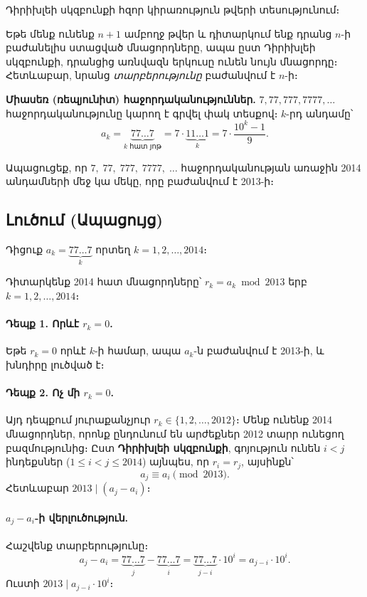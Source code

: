 \documentclass[12pt, a4paper]{article}
\begin{document}
\begin{theorybox}
Դիրիխլեի սկզբունքի հզոր կիրառություն թվերի տեսությունում։

\medskip
Եթե մենք ունենք $n+1$ ամբողջ թվեր և դիտարկում ենք դրանց $n$-ի բաժանելիս ստացված մնացորդները,
ապա ըստ Դիրիխլեի սկզբունքի, դրանցից առնվազն երկուսը ունեն
նույն մնացորդը։ Հետևաբար, նրանց \emph{տարբերությունը} բաժանվում է $n$-ի։

\medskip
\textbf{Միասեռ (ռեպյունիտ) հաջորդականություններ.}\;
$7, 77, 777, 7777, \ldots$ հաջորդականությունը կարող է գրվել փակ տեսքով։
$k$-րդ անդամը՝
\[
  a_k = \underbrace{77\ldots7}_{k \text{ հատ յոթ}}
      = 7 \cdot \underbrace{11\ldots1}_{k}
      = 7 \cdot \frac{10^k - 1}{9}.
\]
\end{theorybox}

\begin{problembox}
Ապացուցեք, որ $7,\; 77,\; 777,\; 7777,\; \ldots$ հաջորդականության
առաջին 2014 անդամների մեջ կա մեկը, որը բաժանվում է 2013-ի։
\end{problembox}

\subsection*{Լուծում (Ապացույց)}

Դիցուք $a_k = \underbrace{77\ldots7}_{k}$ որտեղ $k = 1, 2, \ldots, 2014$։

Դիտարկենք 2014 հատ մնացորդները՝ $r_k = a_k \bmod 2013$ երբ $k = 1, 2, \ldots, 2014$։

\paragraph{Դեպք 1. Որևէ $r_k = 0$.}
Եթե $r_k = 0$ որևէ $k$-ի համար, ապա $a_k$-ն բաժանվում է 2013-ի, և խնդիրը լուծված է։

\paragraph{Դեպք 2. Ոչ մի $r_k = 0$.}
Այդ դեպքում յուրաքանչյուր $r_k \in \{1, 2, \ldots, 2012\}$։
Մենք ունենք 2014 մնացորդներ, որոնք ընդունում են արժեքներ 2012 տարր ունեցող բազմությունից։
Ըստ \textbf{Դիրիխլեի սկզբունքի}, գոյություն ունեն $i < j$ ինդեքսներ
($1 \le i < j \le 2014$) այնպես, որ $r_i = r_j$, այսինքն՝
\[
  a_j \equiv a_i \pmod{2013}.
\]
Հետևաբար $2013 \mid (a_j - a_i)$։

\paragraph{$a_j - a_i$-ի վերլուծություն.}
Հաշվենք տարբերությունը։
\[
  a_j - a_i
  = \underbrace{77\ldots7}_{j} - \underbrace{77\ldots7}_{i}
  = \underbrace{77\ldots7}_{j-i} \cdot 10^i
  = a_{j-i} \cdot 10^i.
\]
Ուստի $2013 \mid a_{j-i} \cdot 10^i$։
\end{document}
